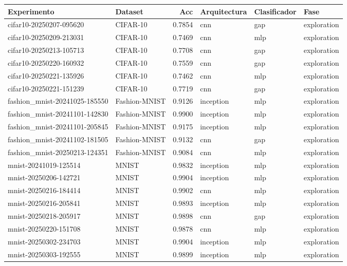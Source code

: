 \begin{tabular}{llrlll}
\toprule
Experimento & Dataset & Acc & Arquitectura & Clasificador & Fase \\
\midrule
cifar10-20250207-095620 & CIFAR-10 & 0.7854 & cnn & gap & exploration \\
cifar10-20250209-213031 & CIFAR-10 & 0.7469 & cnn & mlp & exploration \\
cifar10-20250213-105713 & CIFAR-10 & 0.7708 & cnn & gap & exploration \\
cifar10-20250220-160932 & CIFAR-10 & 0.7559 & cnn & gap & exploration \\
cifar10-20250221-135926 & CIFAR-10 & 0.7462 & cnn & mlp & exploration \\
cifar10-20250221-151239 & CIFAR-10 & 0.7719 & cnn & gap & exploration \\
fashion_mnist-20241025-185550 & Fashion-MNIST & 0.9126 & inception & mlp & exploration \\
fashion_mnist-20241101-142830 & Fashion-MNIST & 0.9900 & inception & mlp & exploration \\
fashion_mnist-20241101-205845 & Fashion-MNIST & 0.9175 & inception & mlp & exploration \\
fashion_mnist-20241102-181505 & Fashion-MNIST & 0.9132 & cnn & gap & exploration \\
fashion_mnist-20250213-124351 & Fashion-MNIST & 0.9084 & cnn & mlp & exploration \\
mnist-20241019-125514 & MNIST & 0.9832 & inception & mlp & exploration \\
mnist-20250206-142721 & MNIST & 0.9904 & inception & mlp & exploration \\
mnist-20250216-184414 & MNIST & 0.9902 & cnn & mlp & exploration \\
mnist-20250216-205841 & MNIST & 0.9893 & inception & mlp & exploration \\
mnist-20250218-205917 & MNIST & 0.9898 & cnn & gap & exploration \\
mnist-20250220-151708 & MNIST & 0.9878 & cnn & mlp & exploration \\
mnist-20250302-234703 & MNIST & 0.9904 & inception & mlp & exploration \\
mnist-20250303-192555 & MNIST & 0.9899 & inception & mlp & exploration \\
\bottomrule
\end{tabular}